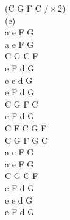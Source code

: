 \documentclass[a5paper, 10pt]{book}
\begin{document}
\begin{minipage}[t]{0.2\textwidth}
  (C G F C $/ \times $2)\\(e)\\
  a e F G\\
  a e F G\\
  C G C F\\
  e F d G\\
  e e d G\\
  e F d G\\

  C G F C\\
  e F d G\\
  C F C G F\\
  C G F G C\\

  a e F G\\
  a e F G\\
  C G C F\\
  e F d G\\
  e e d G\\
  e F d G\\

\end{minipage}

\end{document}
